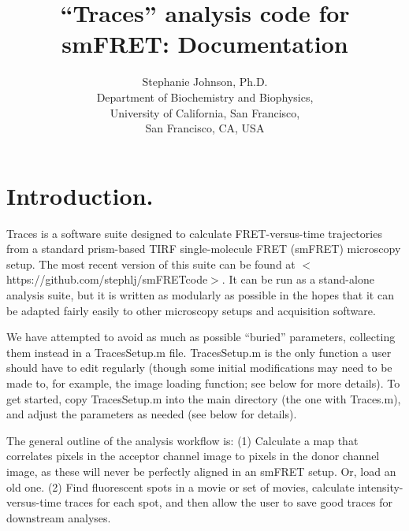 \documentclass[11pt]{article}
\begin{document}
\title{``Traces'' analysis code for smFRET: Documentation}

\author{%
Stephanie Johnson, Ph.D.\\Department of Biochemistry and
     Biophysics, \\University of California, San Francisco, \\San Francisco, CA, USA\\
}
\date{}

\maketitle

\tableofcontents

\newpage

\section{Introduction.}

Traces is a software suite designed to calculate FRET-versus-time trajectories from a standard prism-based TIRF single-molecule FRET (smFRET) microscopy setup.  The most recent version of this suite can be found at $<$https://github.com/stephlj/smFRETcode$>$.  It can be run as a stand-alone analysis suite, but it is written as modularly as possible in the hopes that it can be adapted fairly easily to other microscopy setups and acquisition software.  

We have attempted to avoid as much as possible ``buried'' parameters, collecting them instead in a TracesSetup.m file.  TracesSetup.m is the only function a user should have to edit regularly (though some initial modifications may need to be made to, for example, the image loading function; see below for more details). To get started, copy TracesSetup.m into the main directory (the one with Traces.m), and adjust the parameters as needed (see below for details). %

The general outline of the analysis workflow is: (1) Calculate a map that correlates pixels in the acceptor channel image to pixels in the donor channel image, as these will never be perfectly aligned in an smFRET setup. Or, load an old one. (2) Find fluorescent spots in a movie or set of movies, calculate intensity-versus-time traces for each spot, and then allow the user to save good traces for downstream analyses.
\end{document}
